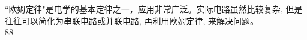 \documentclass[UTF8]{ctexart}
\begin{document}
	``欧姆定律"是电学的基本定律之一，应用非常广泛。实际电路虽然比较复杂, 但是往往可以简化为串联电路或并联电路, 再利用欧姆定律, 来解决问题。 \\
	
	
	
	
	88
	
	
	
	
	
	
	
	
	
	
	
	
	
	
	
	
	
	
	
	
		

	


	
	
	
	
	
	
	
	
	
	
	
	
\end{document}

